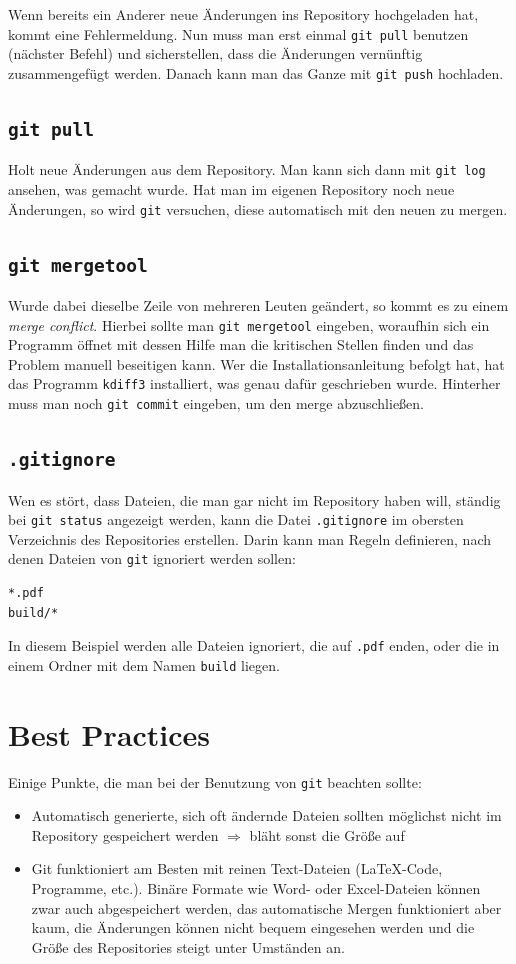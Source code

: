 Wenn bereits ein Anderer neue Änderungen ins Repository hochgeladen hat, kommt eine Fehlermeldung.
Nun muss man erst einmal \verb|git pull| benutzen (nächster Befehl) und sicherstellen, dass die Änderungen vernünftig zusammengefügt werden.
Danach kann man das Ganze mit \verb|git push| hochladen.

\subsection{\texttt{git pull}}
Holt neue Änderungen aus dem Repository.
Man kann sich dann mit \verb|git log| ansehen, was gemacht wurde.
Hat man im eigenen Repository noch neue Änderungen, so wird \texttt{git} versuchen, diese automatisch mit den neuen zu mergen.

\subsection{\texttt{git mergetool}}
Wurde dabei dieselbe Zeile von mehreren Leuten geändert, so kommt es zu einem \textit{merge conflict}.
Hierbei sollte man \verb|git mergetool| eingeben, woraufhin sich ein Programm öffnet mit dessen Hilfe man die kritischen Stellen finden und das Problem manuell beseitigen kann.
Wer die Installationsanleitung befolgt hat, hat das Programm \verb|kdiff3| installiert, was genau dafür geschrieben wurde.
Hinterher muss man noch \verb|git commit| eingeben, um den merge abzuschließen.

\subsection{\texttt{.gitignore}}
Wen es stört, dass Dateien, die man gar nicht im Repository haben will, ständig bei \verb|git status| angezeigt werden, kann die Datei \verb|.gitignore| im obersten Verzeichnis des Repositories erstellen.
Darin kann man Regeln definieren, nach denen Dateien von \verb|git| ignoriert werden sollen:
\begin{verbatim}
*.pdf
build/*
\end{verbatim}
In diesem Beispiel werden alle Dateien ignoriert, die auf \verb|.pdf| enden, oder die in einem Ordner mit dem Namen \verb|build| liegen.

\section{Best Practices}

Einige Punkte, die man bei der Benutzung von \texttt{git} beachten sollte:
\begin{itemize}
  \item Automatisch generierte, sich oft ändernde Dateien sollten möglichst nicht im Repository gespeichert werden
    $\Rightarrow$ bläht sonst die Größe auf
  \item Git funktioniert am Besten mit reinen Text-Dateien (\LaTeX-Code, Programme, etc.).
    Binäre Formate wie Word- oder Excel-Dateien können zwar auch abgespeichert werden, das automatische Mergen funktioniert aber kaum, die Änderungen können nicht bequem eingesehen werden und die Größe des Repositories steigt unter Umständen an.
\end{itemize}

